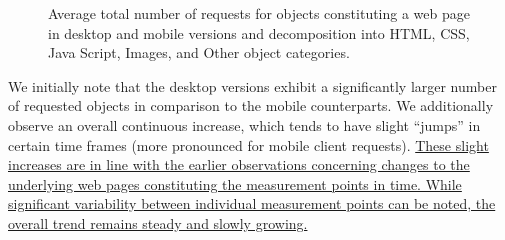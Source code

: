 \documentclass[onecolumn,12pt]{IEEEtran}
\begin{document}
\begin{figure}
	\qquad
	\qquad
\caption{Average total number of requests for objects constituting a web page in desktop and mobile versions and decomposition into  HTML, CSS, Java Script, Images, and Other object categories.\label{fig:requests}}
\end{figure}
We initially note that the desktop versions exhibit a significantly larger number of requested objects in comparison to the mobile counterparts.
We additionally observe an overall continuous increase, which tends to have slight ``jumps'' in certain time frames (more pronounced for mobile client requests). \uline{These slight increases are in line with the earlier observations concerning changes to the underlying web pages constituting the measurement points in time. While significant variability between individual measurement points can be noted,  the overall trend remains steady and slowly growing.}
\end{document}
